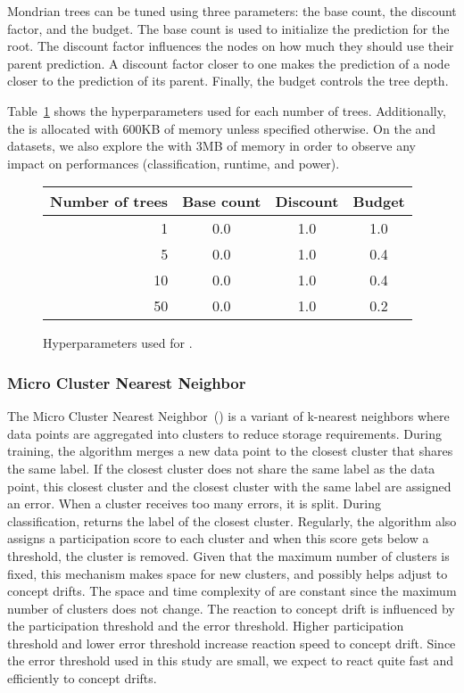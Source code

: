 Mondrian trees can be tuned using three
parameters: the base count, the discount factor,
and the budget. The base count is used to
initialize the prediction for the root. The
discount factor influences the nodes on how much
they should use their parent prediction. A
discount factor closer to one makes the prediction
of a node closer to the prediction of its parent.
Finally, the budget controls the tree depth.

Table~\ref{table:hyperparameter-mondrian} shows
the hyperparameters used for each number of trees.
Additionally, the \mondrianforest is allocated
with 600KB of memory unless specified otherwise.
On the \banosdataset and \recofitdataset datasets,
we also explore the \mondrianforest with 3MB of
memory in order to observe any impact on
performances (classification, runtime, and power).
\begin{figure}
	\begin{center}
		\begin{tabular}{|| r | c | c | c ||} 
			\hline
			Number of trees &  Base count & Discount & Budget \\ [0.5ex] 
			\hline\hline
			1 & 0.0 & 1.0 & 1.0 \\
			5 & 0.0 & 1.0 & 0.4 \\
			10 & 0.0 & 1.0 & 0.4 \\
			50 & 0.0 & 1.0 & 0.2 \\
			\hline
		\end{tabular}
	\end{center}
	\caption{Hyperparameters used for \mondrianforest.}
		\label{table:hyperparameter-mondrian}
\end{figure}
\subsubsection{Micro Cluster Nearest Neighbor~\cite{mc-nn}}
The Micro Cluster Nearest Neighbor~(\mcnn) is a
variant of k-nearest neighbors where data points
are aggregated into clusters to reduce storage
requirements.  During training, the algorithm
merges a new data point to the closest cluster
that shares the same label. If the closest cluster
does not share the same label as the data point,
this closest cluster and the closest cluster with
the same label are assigned an error. When a
cluster receives too many errors, it is split.
During classification, \mcnn returns the label of
the closest cluster.  Regularly, the algorithm
also assigns a participation score to each cluster
and when this score gets below a threshold, the
cluster is removed. Given that the maximum number
of clusters is fixed, this mechanism makes
space for new clusters, and possibly
helps adjust to concept drifts.  
The space and time complexity of \mcnn are
constant since the maximum number of clusters does
not change.
The reaction to concept drift is influenced by the
participation threshold and the error threshold.
Higher participation threshold and lower error
threshold increase reaction speed to concept
drift. Since the error threshold used in this
study are small, we expect \mcnn to react quite
fast and efficiently to concept drifts.


